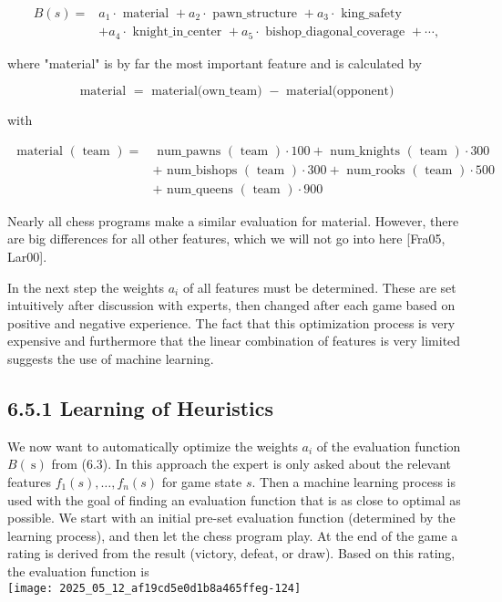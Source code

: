 \documentclass[10pt]{article}
\begin{document}
\begin{align*}
B(s)= & a_{1} \cdot \text { material }+a_{2} \cdot \text { pawn_structure }+a_{3} \cdot \text { king_safety } \\
& +a_{4} \cdot \text { knight_in_center }+a_{5} \cdot \text { bishop_diagonal_coverage }+\cdots, \tag{6.3}
\end{align*}


where "material" is by far the most important feature and is calculated by

$$
\text { material }=\text { material(own_team) }- \text { material(opponent) }
$$

with

$$
\begin{aligned}
\text { material }(\text { team })= & \text { num_pawns }(\text { team }) \cdot 100+\text { num_knights }(\text { team }) \cdot 300 \\
& + \text { num_bishops }(\text { team }) \cdot 300+\text { num_rooks }(\text { team }) \cdot 500 \\
& + \text { num_queens }(\text { team }) \cdot 900
\end{aligned}
$$

Nearly all chess programs make a similar evaluation for material. However, there are big differences for all other features, which we will not go into here [Fra05, Lar00].

In the next step the weights $a_{i}$ of all features must be determined. These are set intuitively after discussion with experts, then changed after each game based on positive and negative experience. The fact that this optimization process is very expensive and furthermore that the linear combination of features is very limited suggests the use of machine learning.

\subsection*{6.5.1 Learning of Heuristics}
We now want to automatically optimize the weights $a_{i}$ of the evaluation function $B(\mathrm{~s})$ from (6.3). In this approach the expert is only asked about the relevant features $f_{1}(s), \ldots, f_{n}(s)$ for game state $s$. Then a machine learning process is used with the goal of finding an evaluation function that is as close to optimal as possible. We start with an initial pre-set evaluation function (determined by the learning process), and then let the chess program play. At the end of the game a rating is derived from the result (victory, defeat, or draw). Based on this rating, the evaluation function is\\
\texttt{[image: 2025\_05\_12\_af19cd5e0d1b8a465ffeg-124]}
\end{document}
